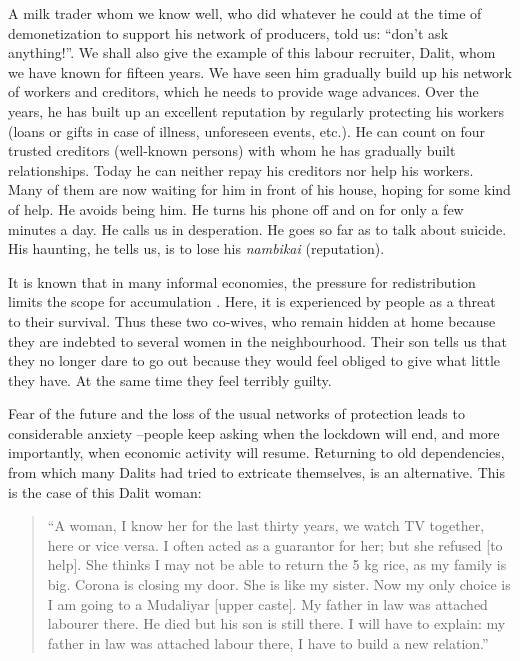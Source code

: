 \documentclass[a4paper, 11pt, onecolumn]{article}
\begin{document}
A milk trader whom we know well, who did whatever he could at the time of demonetization to support his network of producers, told us: ``don’t ask anything!''.
We shall also give the example of this labour recruiter, Dalit, whom we have known for fifteen years. 
We have seen him gradually build up his network of workers and creditors, which he needs to provide wage advances. 
Over the years, he has built up an excellent reputation by regularly protecting his workers (loans or gifts in case of illness, unforeseen events, etc.). 
He can count on four trusted creditors (well-known persons) with whom he has gradually built relationships. 
Today he can neither repay his creditors nor help his workers. 
Many of them are now waiting for him in front of his house, hoping for some kind of help. 
He avoids being him. 
He turns his phone off and on for only a few minutes a day. 
He calls us in desperation. 
He goes so far as to talk about suicide. 
His haunting, he tells us, is to lose his \textit{nambikai} (reputation).

It is known that in many informal economies, the pressure for redistribution limits the scope for accumulation \citep{Platteau2015, Nguyen2017}. 
Here, it is experienced by people as a threat to their survival. 
Thus these two co-wives, who remain hidden at home because they are indebted to several women in the neighbourhood. 
Their son tells us that they no longer dare to go out because they would feel obliged to give what little they have. 
At the same time they feel terribly guilty.

Fear of the future and the loss of the usual networks of protection leads to considerable anxiety --people keep asking when the lockdown will end, and more importantly, when economic activity will resume. 
Returning to old dependencies, from which many Dalits had tried to extricate themselves, is an alternative.
This is the case of this Dalit woman:

\begin{quote}
``A woman, I know her for the last thirty years, we watch TV together, here or vice versa. 
I often acted as a guarantor for her; but she refused [to help]. 
She thinks I may not be able to return the 5 kg rice, as my family is big. 
Corona is closing my door. 
She is like my sister. 
Now my only choice is I am going to a Mudaliyar [upper caste]. 
My father in law was attached labourer there. 
He died but his son is still there. 
I will have to explain: my father in law was attached labour there, I have to build a new relation.'' 
\end{quote}
\end{document}

